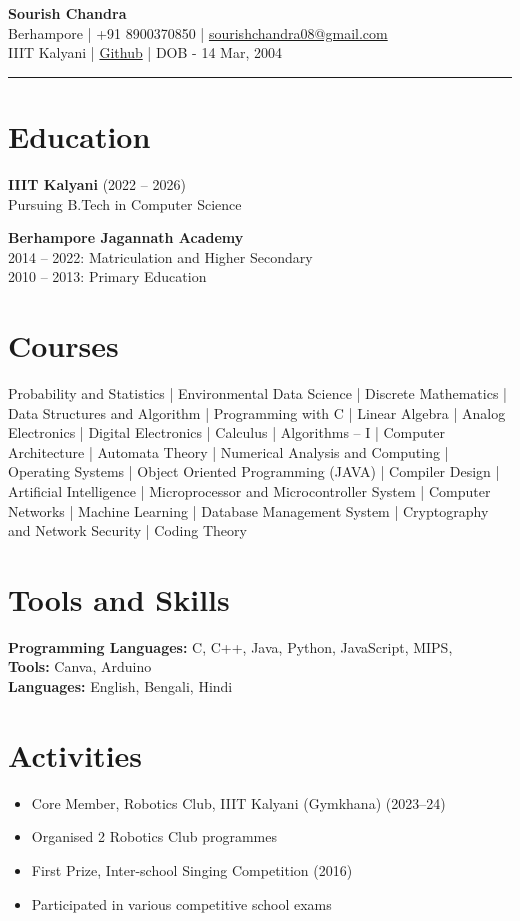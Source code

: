 \documentclass[a4paper,10pt]{article}
\begin{document}
\begin{center}
    {\Large \textbf{Sourish Chandra}} \\
    Berhampore | +91 8900370850 | \href{mailto:sourishchandra08@gmail.com}{sourishchandra08@gmail.com} \\
    IIIT Kalyani | \href{https://github.com/sourish0}{Github} | DOB - 14 Mar, 2004
\end{center}

\noindent\rule{\linewidth}{0.4pt}  %

\begin{multicols}{2}
\section*{Education}
\textbf{IIIT Kalyani} (2022 – 2026) \\
Pursuing B.Tech in Computer Science

\textbf{Berhampore Jagannath Academy} \\
2014 – 2022: Matriculation and Higher Secondary \\
2010 – 2013: Primary Education

\section*{Courses}
\sloppy
Probability and Statistics | Environmental Data Science | Discrete Mathematics | Data Structures and Algorithm | Programming with C | Linear Algebra | Analog Electronics | Digital Electronics | Calculus | Algorithms – I | Computer Architecture | Automata Theory | Numerical Analysis and Computing | Operating Systems | Object Oriented Programming (JAVA) | Compiler Design | Artificial Intelligence | Microprocessor and Microcontroller System | Computer Networks | Machine Learning | Database Management System | Cryptography and Network Security | Coding Theory

\columnbreak

\section*{Tools and Skills}
\textbf{Programming Languages:} C, C++, Java, Python, JavaScript, MIPS,  \\
\textbf{Tools:} Canva, Arduino \\
\textbf{Languages:} English, Bengali, Hindi

\section*{Activities}
\begin{itemize}
    \item Core Member, Robotics Club, IIIT Kalyani (Gymkhana) (2023–24)
    \item Organised 2 Robotics Club programmes
    \item First Prize, Inter-school Singing Competition (2016)
    \item Participated in various competitive school exams
\end{itemize}


\end{multicols}
\end{document}
